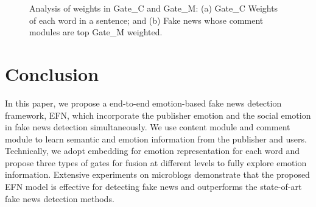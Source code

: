 \documentclass{article}
\newcommand{\m}{EFN}
\begin{document}
	\begin{figure}
		\centering
		
		\begin{minipage}[t]{0.23\textwidth}
		\end{minipage}
		\begin{minipage}[t]{0.23\textwidth}
		\end{minipage}
		
		\caption{Analysis of weights in Gate\_C and Gate\_M: (a) Gate\_C Weights of each word in a sentence; and (b) Fake news whose comment modules are top Gate\_M weighted.}
		\label{Fig:casestudy}
		\vspace{-0.35cm}
	\end{figure}
	
	\section{Conclusion}
	In this paper, we propose a end-to-end emotion-based fake news detection framework, {\m}, which incorporate the publisher emotion and the social emotion in fake news detection simultaneously. We use content module and comment module to learn semantic and emotion information from the publisher and users. Technically, we adopt embedding for emotion representation for each word and propose three types of gates for fusion at different levels to fully explore emotion information.  Extensive experiments on microblogs demonstrate that the proposed {\m} model is effective for detecting fake news and outperforms the state-of-art  fake news detection methods.
	
	\appendix
	
	
	
\end{document}
